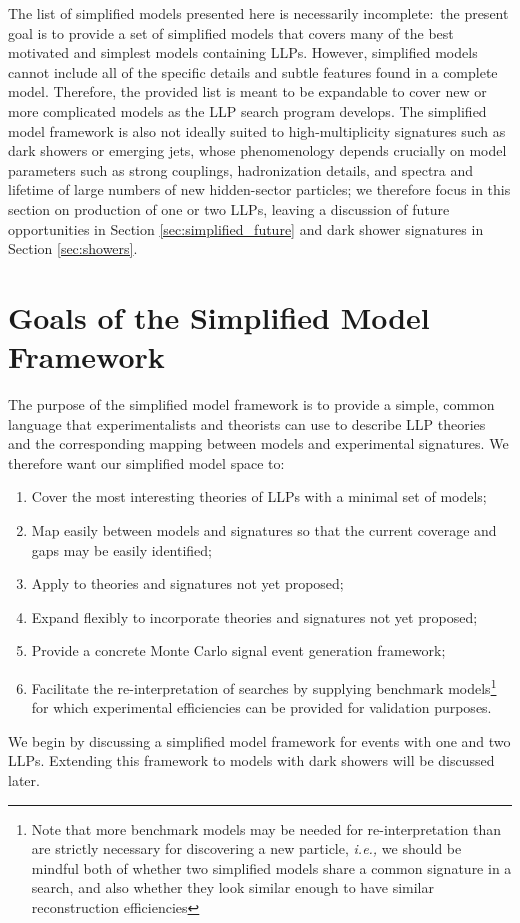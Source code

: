 The list of simplified models presented here is necessarily incomplete:~the present goal is to provide a set of simplified models that covers many of the best motivated and simplest models containing LLPs. However, simplified models cannot include all of the specific details and subtle features found in a complete model. Therefore, the provided list is meant to be expandable to cover new or more complicated models as the LLP search program develops. The simplified model framework is also not ideally suited to high-multiplicity signatures such as dark showers or emerging jets, whose phenomenology depends crucially on model parameters such as strong couplings, hadronization details, and  spectra and lifetime of large numbers of new hidden-sector particles; we therefore focus in this section on production of one or two LLPs, leaving a discussion of future opportunities in Section \ref{sec:simplified_future} and dark shower signatures in Section \ref{sec:showers}.

\section{Goals of the Simplified Model Framework}
The purpose of the simplified model framework is to provide a simple, common language that experimentalists and theorists can use to describe LLP theories and the corresponding mapping between models and experimental signatures. We therefore want our simplified model space to:
%
\begin{enumerate}
%
\item Cover the most interesting theories of LLPs with a minimal set of models;
\item Map easily between models and signatures so that the current coverage and gaps may be easily identified;
\item Apply to theories and signatures not yet proposed;
\item Expand flexibly to incorporate theories and signatures not yet proposed;
\item Provide a concrete Monte Carlo signal event generation framework;
\item Facilitate the re-interpretation of searches by supplying benchmark models\footnote{Note that more benchmark models may be needed for re-interpretation than are strictly necessary for discovering a new particle, \emph{i.e.,} we should be mindful both of whether two simplified models share a common signature in a search, and also whether they look similar enough to have similar reconstruction efficiencies} for which experimental efficiencies can be provided for validation purposes.
\end{enumerate}
%
We begin by discussing a simplified model framework for events with one and two LLPs.  Extending this  framework to models with dark showers will be discussed later.


